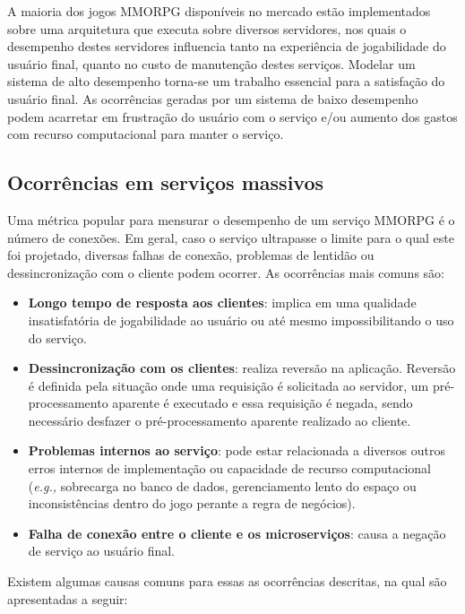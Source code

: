 A maioria dos jogos \ac{MMORPG} disponíveis no mercado estão implementados sobre uma arquitetura que executa sobre diversos servidores, nos quais o desempenho destes servidores influencia tanto na experiência de jogabilidade do usuário final, quanto no custo de manutenção destes serviços.
%
Modelar um sistema de alto desempenho torna-se um trabalho essencial para a satisfação do usuário final\cite{1417630}.
%
As ocorrências geradas por um sistema de baixo desempenho podem acarretar em frustração do usuário com o serviço e/ou aumento dos gastos com recurso computacional para manter o serviço.


\subsection{Ocorrências em serviços massivos}
\label{sec:ocorrencias}

Uma métrica popular para mensurar o desempenho de um serviço \ac{MMORPG} é o número de conexões\cite{1417630}.
%
Em geral, caso o serviço ultrapasse o limite para o qual este foi projetado, diversas falhas de conexão, problemas de lentidão ou dessincronização com o cliente podem ocorrer.
%
As ocorrências mais comuns são\cite{1417630}:

\begin{itemize}
  \item \textbf{Longo tempo de resposta aos clientes}: implica em uma qualidade insatisfatória de jogabilidade ao usuário ou até mesmo impossibilitando o uso do serviço.
  \item \textbf{Dessincronização com os clientes}: realiza reversão na aplicação. Reversão é definida pela situação onde uma requisição é solicitada ao servidor, um pré-processamento aparente é executado e essa requisição é negada, sendo necessário desfazer o pré-processamento aparente realizado ao cliente.
  \item \textbf{Problemas internos ao serviço}:  pode estar relacionada a diversos outros erros internos de implementação ou capacidade de recurso computacional (\textit{e.g.,} sobrecarga no banco de dados, gerenciamento lento do espaço ou inconsistências dentro do jogo perante a regra de negócios).
  \item \textbf{Falha de conexão entre o cliente e os microserviços}: causa a negação de serviço ao usuário final.
\end{itemize}

Existem algumas causas comuns para essas as ocorrências descritas\cite{1417630}, na qual são apresentadas a seguir:

